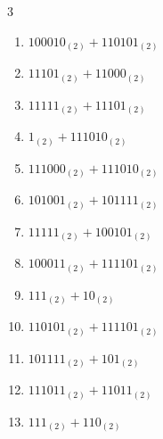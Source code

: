 \begin{multicols}{3}
\begin{enumerate}
  \item $100010_{(2)} + 110101_{(2)}$


  \item $11101_{(2)} + 11000_{(2)}$


  \item $11111_{(2)} + 11101_{(2)}$


  \item $1_{(2)} + 111010_{(2)}$


  \item $111000_{(2)} + 111010_{(2)}$


  \item $101001_{(2)} + 101111_{(2)}$


  \item $11111_{(2)} + 100101_{(2)}$


  \item $100011_{(2)} + 111101_{(2)}$


  \item $111_{(2)} + 10_{(2)}$


  \item $110101_{(2)} + 111101_{(2)}$


\columnbreak %

\resetques

  \item $101111_{(2)} + 101_{(2)}$


  \item $111011_{(2)} + 11011_{(2)}$


  \item $111_{(2)} + 110_{(2)}$



\end{enumerate}
\end{multicols}
